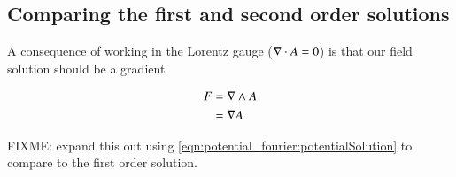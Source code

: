 \subsection{Comparing the first and second order solutions }

A consequence of working in the Lorentz gauge ($\nabla \cdot A = 0$) is that our field solution should be a gradient

\begin{align*}
F 
&= \nabla \wedge A \\
&= \nabla A \\
\end{align*}


FIXME: expand this out using \ref{eqn:potential_fourier:potentialSolution} to compare to the first order solution.
